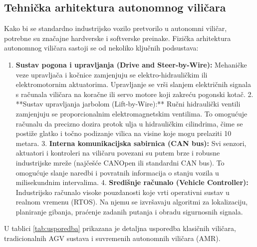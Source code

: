 \subsection{Tehnička arhitektura autonomnog viličara}
Kako bi se standardno industrijsko vozilo pretvorilo u autonomni viličar, potrebne su značajne hardverske i softverske preinake. Fizička arhitektura autonomnog viličara sastoji se od nekoliko ključnih podsustava:
\begin{enumerate}
  \item \textbf{Sustav pogona i upravljanja (Drive and Steer-by-Wire):} Mehaničke veze upravljača i kočnice zamjenjuju se elektro-hidrauličkim ili elektromotornim aktuatorima. Upravljanje se vrši slanjem električnih signala s računala viličara na koračne ili servo motore koji zakreću pogonski kotač.
2. **Sustav upravljanja jarbolom (Lift-by-Wire):** Ručni hidraulički ventili zamjenjuju se proporcionalnim elektromagnetskim ventilima. To omogućuje računalu da precizno dozira protok ulja u hidrauličkim cilindrima, čime se postiže glatko i točno podizanje vilica na visine koje mogu prelaziti 10 metara.
3. \textbf{Interna komunikacijska sabirnica (CAN bus):} Svi senzori, aktuatori i kontroleri na viličaru povezani su putem brze i robusne industrijske mreže (najčešće CANOpen ili standardni CAN bus). To omogućuje slanje naredbi i povratnih informacija o stanju vozila u milisekundnim intervalima.
4. \textbf{Središnje računalo (Vehicle Controller):} Industrijsko računalo visoke pouzdanosti koje vrti operativni sustav u realnom vremenu (RTOS). Na njemu se izvršavaju algoritmi za lokalizaciju, planiranje gibanja, praćenje zadanih putanja i obradu sigurnosnih signala.
\end{enumerate}

U tablici \ref{tab:usporedba} prikazana je detaljna usporedba klasičnih viličara, tradicionalnih AGV sustava i suvremenih autonomnih viličara (AMR).


